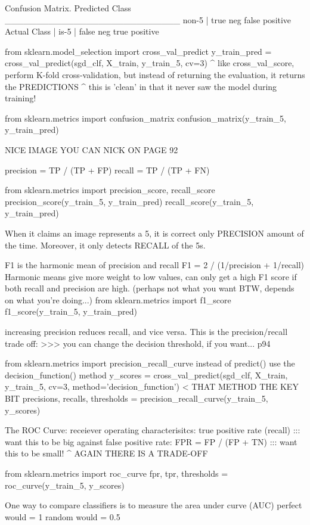 Confusion Matrix.
                    Predicted Class
                    ____________________________
             non-5 | true neg     false positive
Actual Class       |
             is-5  | false neg    true positive

from sklearn.model_selection import cross_val_predict             
y_train_pred = cross_val_predict(sgd_clf, X_train, y_train_5, cv=3)
^ like cross_val_score, perform K-fold cross-validation,
but instead of returning the evaluation, it returns the PREDICTIONS
^ this is 'clean' in that it never saw the model during training!

from sklearn.metrics import confusion_matrix
confusion_matrix(y_train_5, y_train_pred)

NICE IMAGE YOU CAN NICK ON PAGE 92

precision = TP / (TP + FP)
recall = TP / (TP + FN)

from sklearn.metrics import precision_score, recall_score
precision_score(y_train_5, y_train_pred)
recall_score(y_train_5, y_train_pred)

When it claims an image represents a 5,
it is correct only PRECISION amount of the time.
Moreover, it only detects RECALL of the 5s.

F1 is the harmonic mean of precision and recall
F1 = 2 / (1/precision + 1/recall)
Harmonic means give more weight to low values,
can only get a high F1 score if both recall and precision are high.
(perhaps not what you want BTW, depends on what you're doing...)
from sklearn.metrics import f1_score
f1_score(y_train_5, y_train_pred)

increasing precision reduces recall, and vice versa.
This is the precision/recall trade off:
>>> you can change the decision threshold, if you want... p94

from sklearn.metrics import precision_recall_curve
instead of predict() use the decision_function() method
y_scores = cross_val_predict(sgd_clf, X_train, y_train_5, cv=3, method='decision_function') < THAT METHOD THE KEY BIT
precisions, recalls, thresholds = precision_recall_curve(y_train_5, y_scores)

The ROC Curve:
receiever operating characterisitcs:
true positive rate (recall) ::: want this to be big
against false positive rate:
FPR = FP / (FP + TN) ::: want this to be small!
^ AGAIN THERE IS A TRADE-OFF

from sklearn.metrics import roc_curve
fpr, tpr, thresholds = roc_curve(y_train_5, y_scores)

One way to compare classifiers is to measure the area under curve (AUC)
perfect would = 1
random would = 0.5

